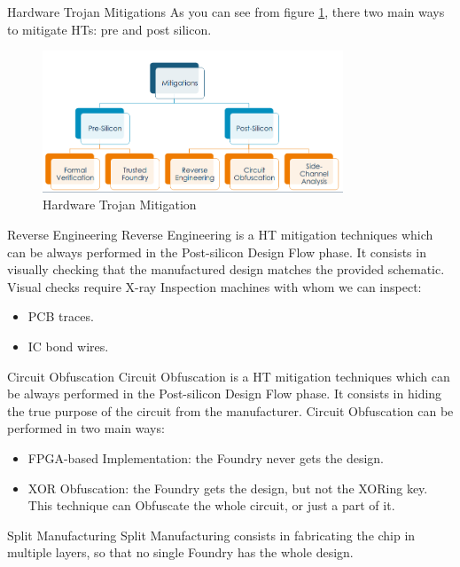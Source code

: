 \begin{section}{Hardware Trojan Mitigations}
  As you can see from figure \ref{fig:hw-trojan-mitigation}, there two main ways to mitigate HTs:
  pre and post silicon.
  \begin{figure}[H]
    \centering
    \includegraphics[width=0.8\textwidth]{img/hardware/hw trojan mitigation.png}
    \caption{Hardware Trojan Mitigation}
    \label{fig:hw-trojan-mitigation}
  \end{figure}
  \begin{subsection}{Reverse Engineering}
    Reverse Engineering is a HT mitigation techniques which can be always performed in the
    Post-silicon Design Flow phase. It consists in visually checking that the manufactured design
    matches the provided schematic.
    Visual checks require X-ray Inspection machines with whom we can inspect:
    \begin{itemize}
      \item PCB traces.
      \item IC bond wires.
    \end{itemize}
  \end{subsection}

  \begin{subsection}{Circuit Obfuscation}
    Circuit Obfuscation is a HT mitigation techniques which can be always performed in the
    Post-silicon Design Flow phase. It consists in hiding the true purpose of the circuit from the
    manufacturer. Circuit Obfuscation can be performed in two main ways:
    \begin{itemize}
      \item FPGA-based Implementation: the Foundry never gets the design.
      \item XOR Obfuscation: the Foundry gets the design, but not the XORing key. This technique can
        Obfuscate the whole circuit, or just a part of it.
    \end{itemize}
  \end{subsection}

  \begin{subsection}{Split Manufacturing}
    Split Manufacturing consists in fabricating the chip in multiple layers, so that no single
    Foundry has the whole design.

  \end{subsection}

\end{section}
